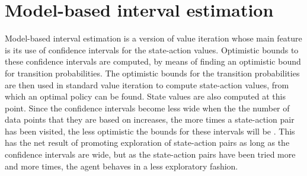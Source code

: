 \section{Model-based interval estimation}
\label{sec:mbie}
Model-based interval estimation is a version of value iteration whose main feature is its use of confidence intervals for the state-action values. Optimistic bounds to these confidence intervals are computed, by means of finding an optimistic bound for transition probabilities. The optimistic bounds for the transition probabilities are then used in standard value iteration to compute state-action values, from which an optimal policy can be found. State values are also computed at this point. Since the confidence intervals become less wide when the the number of data points that they are based on increases, the more times a state-action pair has been visited, the less optimistic the bounds for these intervals will be 
\parencite{dietterich2013pac}. This has the net result of promoting exploration of state-action pairs as long as the confidence intervals are wide, but as the state-action pairs have been tried more and more times, the agent behaves in a less exploratory fashion. 




\begin{comment}
Model-based interval estimation is a modification of value iteration whose main feature is its  addition of confidence
intervals to the state-action values. These confidence intervals allow the agent to choose between
actions, based on how confident it is about its evaluation of them. In effect,
the less certain the agent is about its evaluation of the states and actions,
the more exploratory the actions will be. When the agent is more confident
however, it will exploit what it has learned so far about the MDP
\parencite{dietterich2013pac}.
\end{comment}



